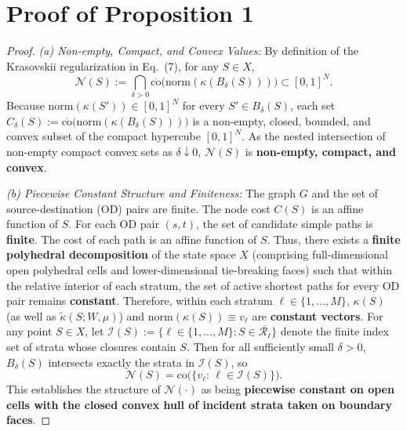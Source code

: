 \documentclass[11pt]{article}
\newcommand{\rev}[1]{#1}
\newenvironment{IEEEproof}{\begin{proof}}{\end{proof}}
\begin{document}
\section{Proof of Proposition 1}
\label{app:proof_prop_usc}
\begin{IEEEproof}
\textit{(a) Non-empty, Compact, and Convex Values:}
\rev{By definition of the Krasovskii regularization in Eq.~(7), for any $S \in X$,
\begin{equation}
\mathcal N(S) := \bigcap_{\delta > 0} \overline{\mathrm{co}}\!\big(\mathrm{norm}(\kappa(B_\delta(S)))\big) \subset [0,1]^N.
\end{equation}
Because $\mathrm{norm}(\kappa(S')) \in [0,1]^N$ for every $S' \in B_\delta(S)$, each set $C_\delta(S) := \overline{\mathrm{co}}\big(\mathrm{norm}(\kappa(B_\delta(S)))\big)$ is a non-empty, closed, bounded, and convex subset of the compact hypercube $[0,1]^N$. As the nested intersection of non-empty compact convex sets as $\delta \downarrow 0$, $\mathcal N(S)$ is \textbf{non-empty, compact, and convex}.}

\textit{(b) Piecewise Constant Structure and Finiteness:}
The graph $G$ and the set of source-destination (OD) pairs are finite. The node cost $C(S)$ is an affine function of $S$. For each OD pair $(s,t)$, the set of candidate simple paths is \textbf{finite}. The cost of each path is an affine function of $S$. Thus, there exists a \textbf{finite polyhedral decomposition} of the state space $X$ (comprising full-dimensional open polyhedral cells and lower-dimensional tie-breaking faces) such that within the relative interior of each stratum, the set of active shortest paths for every OD pair remains \textbf{constant}. Therefore, within each stratum $\ell \in \{1,\dots,M\}$, $\kappa(S)$ (as well as $\widetilde{\kappa}(S;W,\mu)$) and $\mathrm{norm}(\kappa(S)) \equiv v_\ell$ are \textbf{constant vectors}. For any point $S \in X$, let $\mathcal I(S) := \{\ell \in \{1,\dots,M\} : S \in \overline{\mathcal{R}_\ell}\}$ denote the finite index set of strata whose closures contain $S$. Then for all sufficiently small $\delta > 0$, $B_\delta(S)$ intersects exactly the strata in $\mathcal I(S)$, so
\begin{equation}
\mathcal N(S)=\mathrm{co}\big(\{v_\ell:\,\ell\in\mathcal I(S)\}\big).
\end{equation}
This establishes the structure of $\mathcal N(\cdot)$ as being \textbf{piecewise constant on open cells with the closed convex hull of incident strata taken on boundary faces}.


\end{IEEEproof}
\end{document}
